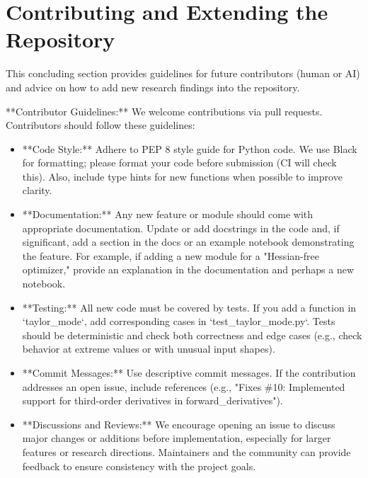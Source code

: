 \documentclass[11pt]{article}
\begin{document}
\section{Contributing and Extending the Repository}
\label{sec:conclusion}

This concluding section provides guidelines for future contributors (human or AI) and advice on how to add new research findings into the repository.

**Contributor Guidelines:**
We welcome contributions via pull requests. Contributors should follow these guidelines:
\begin{itemize}
  \item **Code Style:** Adhere to PEP 8 style guide for Python code. We use Black for formatting; please format your code before submission (CI will check this). Also, include type hints for new functions when possible to improve clarity.
  \item **Documentation:** Any new feature or module should come with appropriate documentation. Update or add docstrings in the code and, if significant, add a section in the docs or an example notebook demonstrating the feature. For example, if adding a new module for a "Hessian-free optimizer," provide an explanation in the documentation and perhaps a new notebook.
  \item **Testing:** All new code must be covered by tests. If you add a function in `taylor_mode`, add corresponding cases in `test_taylor_mode.py`. Tests should be deterministic and check both correctness and edge cases (e.g., check behavior at extreme values or with unusual input shapes).
  \item **Commit Messages:** Use descriptive commit messages. If the contribution addresses an open issue, include references (e.g., "Fixes \#10: Implemented support for third-order derivatives in forward\_derivatives").
  \item **Discussions and Reviews:** We encourage opening an issue to discuss major changes or additions before implementation, especially for larger features or research directions. Maintainers and the community can provide feedback to ensure consistency with the project goals.
\end{itemize}
\end{document}

